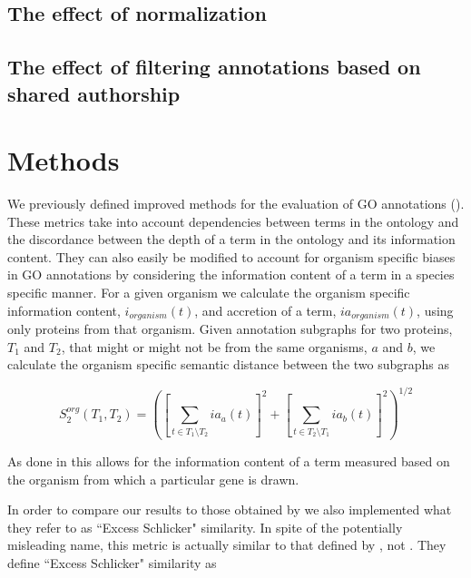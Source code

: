   
  \subsection{The effect of normalization}
  
  \subsection{The effect of filtering annotations based on shared authorship}

\section{Methods}





We previously defined improved methods for the evaluation of  GO annotations  (). These metrics take into account dependencies between terms in the ontology and the discordance between the depth of a term in the ontology and its information content.  They can also easily be modified to account for organism specific biases in GO annotations by considering the information content of a term in a species specific manner.  For a given organism we calculate the organism specific information content, $i_{organism}(t)$, and accretion of a term, $ia_{organism}(t)$, using only proteins from that organism.  Given annotation subgraphs for two proteins, $T_{1}$ and $T_{2}$, that might or might not be from the same organisms,  $a$ and $b$, we calculate the organism specific semantic distance between the two subgraphs as

\[
S^{org}_{2}(T_{1},T_{2})=\left( \left[ \underset{t\in T_{1} \setminus T_{2}}{\sum} ia_{a}(t) \right]^{2} + \left[ \underset{t\in T_{2} \setminus T_{1}}{\sum} ia_{b}(t) \right]^{2} \right)^{1/2}
\]

As done in \citet{Altenhoff2012} this allows for the information content of a term measured based on the organism from which a particular gene is drawn.

In order to compare our results to those obtained by \citet{Altenhoff2012} we also implemented what they refer to as ``Excess Schlicker" similarity.  In spite of the potentially misleading name, this metric is actually similar to that defined by \citet{Lin1998}, not \citet{Schlicker2006}.  They define ``Excess Schlicker" similarity as

